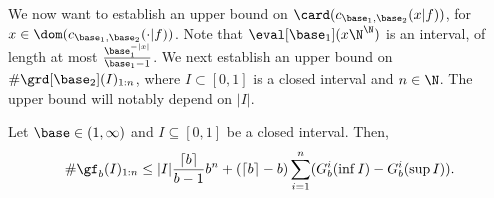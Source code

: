 We now want to establish an upper bound on $\card (c_{\base_1,\base_2}(x|f))$, for $x \in \dom (c_{\base_1,\base_2}(\cdot|f))$.  Note that $\eval[\base_1](x \N^\N)$ is an interval, of length at most $\frac{\base_1^{-|x|}}{\base_1-1}$. We next establish an upper bound on $\# \grd[\base_2](I)_{1:n}$, where $I \subset [0,1]$ is a closed interval and $n \in \N$. The upper bound will notably depend on $|I|$.

\begin{theorem}
    Let $\base \in (1,\infty)$ and $I \subseteq [0,1]$ be a closed interval. Then,
    \begin{equation}\label{eq:bound number canonical sequences interval}
        \# \gf_b(I)_{1:n} \leq |I|\frac{\lceil b \rceil}{b-1} b^{n} + (\lceil b \rceil -b)\sum_{i=1}^n (G_b^i(\inf I) - G_b^i(\sup I)).
    \end{equation}
\end{theorem}
